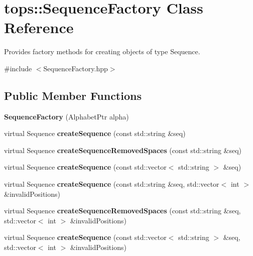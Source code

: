 \hypertarget{classtops_1_1SequenceFactory}{}\section{tops\+:\+:Sequence\+Factory Class Reference}
\label{classtops_1_1SequenceFactory}


Provides factory methods for creating objects of type Sequence.  




{\ttfamily \#include $<$Sequence\+Factory.\+hpp$>$}

\subsection*{Public Member Functions}
\begin{DoxyCompactItemize}
\item 
\mbox{\label{classtops_1_1SequenceFactory_a5bb1d79f5cd39c017509712ea6056af9}} 
{\bfseries Sequence\+Factory} (Alphabet\+Ptr alpha)
\item 
\mbox{\label{classtops_1_1SequenceFactory_a0da487d7ee594b153981e3963eab0c8e}} 
virtual Sequence {\bfseries create\+Sequence} (const std\+::string \&seq)
\item 
\mbox{\label{classtops_1_1SequenceFactory_a06dabd85e1d19af90b376760c2ce2482}} 
virtual Sequence {\bfseries create\+Sequence\+Removed\+Spaces} (const std\+::string \&seq)
\item 
\mbox{\label{classtops_1_1SequenceFactory_a7399a549f7cf5de2302c8ecf0303f2c7}} 
virtual Sequence {\bfseries create\+Sequence} (const std\+::vector$<$ std\+::string $>$ \&seq)
\item 
\mbox{\label{classtops_1_1SequenceFactory_ae8ee7ef566f050e19e9aa4c48f84f464}} 
virtual Sequence {\bfseries create\+Sequence} (const std\+::string \&seq, std\+::vector$<$ int $>$ \&invalid\+Positions)
\item 
\mbox{\label{classtops_1_1SequenceFactory_a1d024b53eb545db4e41ab543494b469f}} 
virtual Sequence {\bfseries create\+Sequence\+Removed\+Spaces} (const std\+::string \&seq, std\+::vector$<$ int $>$ \&invalid\+Positions)
\item 
\mbox{\label{classtops_1_1SequenceFactory_a44d7500c44e4589e1294243c952620c2}} 
virtual Sequence {\bfseries create\+Sequence} (const std\+::vector$<$ std\+::string $>$ \&seq, std\+::vector$<$ int $>$ \&invalid\+Positions)
\end{DoxyCompactItemize}


